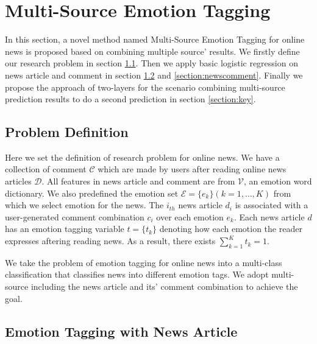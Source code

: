 \documentclass{IEEEtran}
\begin{document}
\section{Multi-Source Emotion Tagging}
\label{section:Method}
In this section, a novel method named Multi-Source Emotion Tagging for online news is proposed based on combining multiple source' results. We firstly define our research problem in section \ref{section:Definition}. Then we apply basic logistic regression on news article and comment in section \ref{section:newscontent} and \ref{section:newscomment}. Finally we propose the approach of two-layers for the scenario combining multi-source prediction results to do a second prediction in section \ref{section:key}.

\vspace{-10pt}
\subsection{Problem Definition}
\label{section:Definition}
Here we set the definition of research problem for online news. We have a collection of comment $\mathcal{C}$ which are made by users after reading online news articles $\mathcal{D}$. All features in news article and comment are from $\mathcal{V}$, an emotion word dictionary.
We also predefined the emotion set $\mathcal{E} = \{e_{k}\}(k=1,\ldots,K)$ from which we select emotion for the news. The $i_{th}$ news article $d_i$ is associated with a user-generated comment combination $c_i$ over each emotion $e_k$. Each news article $d$ has an emotion tagging variable ${t} = \{t_{k}\}$ denoting how each emotion the reader expresses aftering reading news. As a result, there exists $\sum_{k=1}^{K}{t_{k}} = 1$.

We take the problem of emotion tagging for online news into a multi-class classification that classifies news into different emotion tags. We adopt multi-source including the news article and its' comment combination to achieve the goal.

\subsection{Emotion Tagging with News Article}
\label{section:newscontent}
\end{document}
